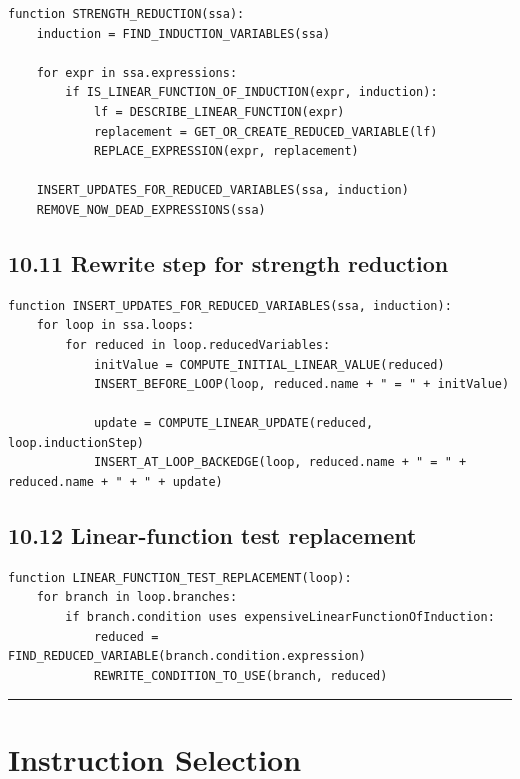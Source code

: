 \documentclass[10pt,letterpaper]{article}
\begin{document}
\begin{verbatim}
function STRENGTH_REDUCTION(ssa):
    induction = FIND_INDUCTION_VARIABLES(ssa)

    for expr in ssa.expressions:
        if IS_LINEAR_FUNCTION_OF_INDUCTION(expr, induction):
            lf = DESCRIBE_LINEAR_FUNCTION(expr)
            replacement = GET_OR_CREATE_REDUCED_VARIABLE(lf)
            REPLACE_EXPRESSION(expr, replacement)

    INSERT_UPDATES_FOR_REDUCED_VARIABLES(ssa, induction)
    REMOVE_NOW_DEAD_EXPRESSIONS(ssa)
\end{verbatim}

\subsection*{10.11 Rewrite step for strength reduction}
{}

\begin{verbatim}
function INSERT_UPDATES_FOR_REDUCED_VARIABLES(ssa, induction):
    for loop in ssa.loops:
        for reduced in loop.reducedVariables:
            initValue = COMPUTE_INITIAL_LINEAR_VALUE(reduced)
            INSERT_BEFORE_LOOP(loop, reduced.name + " = " + initValue)

            update = COMPUTE_LINEAR_UPDATE(reduced, loop.inductionStep)
            INSERT_AT_LOOP_BACKEDGE(loop, reduced.name + " = " + reduced.name + " + " + update)
\end{verbatim}

\subsection*{10.12 Linear-function test replacement}
{}

\begin{verbatim}
function LINEAR_FUNCTION_TEST_REPLACEMENT(loop):
    for branch in loop.branches:
        if branch.condition uses expensiveLinearFunctionOfInduction:
            reduced = FIND_REDUCED_VARIABLE(branch.condition.expression)
            REWRITE_CONDITION_TO_USE(branch, reduced)
\end{verbatim}

\medskip\hrule\medskip

\clearpage
\section{Instruction Selection}
\end{document}
